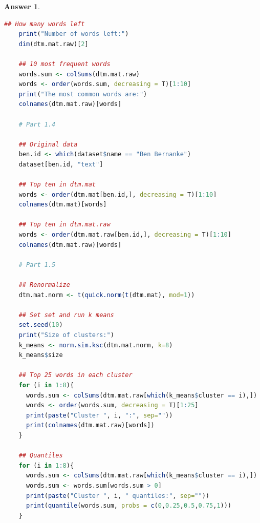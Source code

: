 \documentclass[12pt]{article}
\theoremstyle{colon}
\newtheorem*{answer}{Answer}
\begin{document}
\begin{answer}
\begin{lstlisting}[language=R, basicstyle=\scriptsize, breaklines=true]
    ## How many words left
    print("Number of words left:")
    dim(dtm.mat.raw)[2]

    ## 10 most frequent words
    words.sum <- colSums(dtm.mat.raw)
    words <- order(words.sum, decreasing = T)[1:10]
    print("The most common words are:")
    colnames(dtm.mat.raw)[words]

    # Part 1.4

    ## Original data
    ben.id <- which(dataset$name == "Ben Bernanke")
    dataset[ben.id, "text"]

    ## Top ten in dtm.mat
    words <- order(dtm.mat[ben.id,], decreasing = T)[1:10]
    colnames(dtm.mat)[words]

    ## Top ten in dtm.mat.raw
    words <- order(dtm.mat.raw[ben.id,], decreasing = T)[1:10]
    colnames(dtm.mat.raw)[words]

    # Part 1.5

    ## Renormalize
    dtm.mat.norm <- t(quick.norm(t(dtm.mat), mod=1))

    ## Set set and run k means
    set.seed(10)
    print("Size of clusters:")
    k_means <- norm.sim.ksc(dtm.mat.norm, k=8)
    k_means$size

    ## Top 25 words in each cluster
    for (i in 1:8){
      words.sum <- colSums(dtm.mat.raw[which(k_means$cluster == i),])
      words <- order(words.sum, decreasing = T)[1:25]
      print(paste("Cluster ", i, ":", sep=""))
      print(colnames(dtm.mat.raw)[words])
    }

    ## Quantiles
    for (i in 1:8){
      words.sum <- colSums(dtm.mat.raw[which(k_means$cluster == i),])
      words.sum <- words.sum[words.sum > 0]
      print(paste("Cluster ", i, " quantiles:", sep=""))
      print(quantile(words.sum, probs = c(0,0.25,0.5,0.75,1)))
    }
  \end{lstlisting}
\end{answer}

\clearpage
\end{document}
